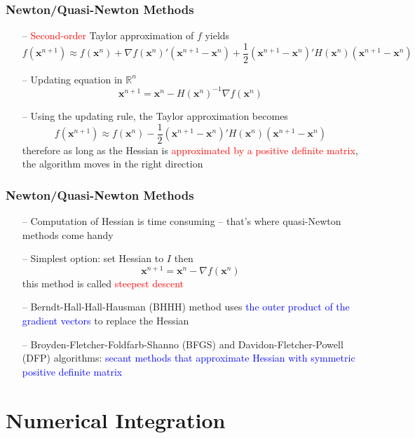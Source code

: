 \documentclass[aspectratio=169, 11pt]{beamer}
\begin{document}
\begin{frame}
\frametitle{Newton/Quasi-Newton Methods}
  \begin{itemize}
    \item[--] \textcolor{red}{Second-order} Taylor approximation of $f$ yields
    \[
      f\left(\mathbf{x}^{n+1}\right)\approx f\left(\mathbf{x}^{n}\right)+\nabla f\left(\mathbf{x}^{n}\right)'\left(\mathbf{x}^{n+1}-\mathbf{x}^{n}\right)+\frac{1}{2}\left(\mathbf{x}^{n+1}-\mathbf{x}^{n}\right)'H\left(\mathbf{x}^{n}\right)\left(\mathbf{x}^{n+1}-\mathbf{x}^{n}\right)
    \]
    \bigskip
    \item[--] Updating equation in $\mathbb{R}^n$
    \[
      \mathbf{x}^{n+1}=\mathbf{x}^{n}-H\left(\mathbf{x}^{n}\right)^{-1}\nabla f\left(\mathbf{x}^{n}\right)
    \]
    \bigskip
    \item[--] Using the updating rule, the Taylor approximation becomes
    \[
      f\left(\mathbf{x}^{n+1}\right)\approx f\left(\mathbf{x}^{n}\right)-\frac{1}{2}\left(\mathbf{x}^{n+1}-\mathbf{x}^{n}\right)'H\left(\mathbf{x}^{n}\right)\left(\mathbf{x}^{n+1}-\mathbf{x}^{n}\right)
    \]
    therefore as long as the Hessian is \textcolor{red}{approximated by a positive definite matrix}, the algorithm moves in the right direction
  \end{itemize}
\end{frame}

\begin{frame}
\frametitle{Newton/Quasi-Newton Methods}
  \begin{itemize}
    \item[--] Computation of Hessian is time consuming -- that's where quasi-Newton methods come handy
    \bigskip
    \item[--] Simplest option: set Hessian to $I$ then
    \[
      \mathbf{x}^{n+1}=\mathbf{x}^{n}-\nabla f\left(\mathbf{x}^{n}\right)
    \]
    this method is called \textcolor{red}{steepest descent}
    \bigskip
    \item[--] Berndt-Hall-Hall-Hausman (BHHH) method uses \textcolor{blue}{the outer product of the gradient vectors} to replace the Hessian
    \item[--] Broyden-Fletcher-Foldfarb-Shanno (BFGS) and Davidon-Fletcher-Powell (DFP) algorithms: \textcolor{blue}{secant methods that approximate Hessian with symmetric positive definite matrix}
  \end{itemize}
\end{frame}

\section{Numerical Integration}
\end{document}
